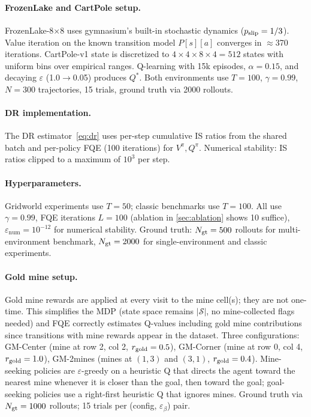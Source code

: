 \documentclass[10pt]{article}
\theoremstyle{plain}
\theoremstyle{definition}
\theoremstyle{remark}
\newcommand{\calS}{\mathcal{S}}
\begin{document}
\paragraph{FrozenLake and CartPole setup.}
FrozenLake-8×8 uses gymnasium's built-in stochastic dynamics
($p_{\rm slip}=1/3$).  Value iteration on the known transition model $P[s][a]$
converges in $\approx$370 iterations.  CartPole-v1 state is discretized to
$4\!\times\!4\!\times\!8\!\times\!4=512$ states with uniform bins over
empirical ranges.  Q-learning with 15k episodes, $\alpha=0.15$, and decaying
$\varepsilon$ (1.0$\to$0.05) produces $Q^*$.  Both environments use $T=100$,
$\gamma=0.99$, $N=300$ trajectories, 15 trials, ground truth via 2000 rollouts.

\paragraph{DR implementation.}
The DR estimator~\eqref{eq:dr} uses per-step cumulative IS ratios from the
shared batch and per-policy FQE (100 iterations) for $V^\pi, Q^\pi$.
Numerical stability: IS ratios clipped to a maximum of $10^3$ per step.

\paragraph{Hyperparameters.}
Gridworld experiments use $T=50$; classic benchmarks use $T=100$.  All use
$\gamma=0.99$, FQE iterations $L=100$ (ablation in \cref{sec:ablation}
shows 10 suffice), $\varepsilon_\mathrm{num}=10^{-12}$ for numerical
stability.  Ground truth: $N_{\rm gt}=500$ rollouts for multi-environment
benchmark, $N_{\rm gt}=2000$ for single-environment and classic experiments.

\paragraph{Gold mine setup.}
Gold mine rewards are applied at every visit to the mine cell(s); they are
not one-time.  This simplifies the MDP (state space remains $|\calS|$, no
mine-collected flags needed) and FQE correctly estimates Q-values including
gold mine contributions since transitions with mine rewards appear in the
dataset.  Three configurations: GM-Center (mine at row 2, col 2, $r_{\rm gold}=0.5$),
GM-Corner (mine at row 0, col 4, $r_{\rm gold}=1.0$), GM-2mines
(mines at $(1,3)$ and $(3,1)$, $r_{\rm gold}=0.4$).  Mine-seeking policies are
$\varepsilon$-greedy on a heuristic Q that directs the agent toward the nearest
mine whenever it is closer than the goal, then toward the goal; goal-seeking
policies use a right-first heuristic Q that ignores mines.  Ground truth via
$N_{\rm gt}=1000$ rollouts; 15 trials per (config, $\varepsilon_\beta$) pair.
\end{document}
